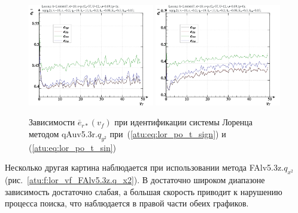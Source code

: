\begin{figure}[h!]
  \centerline{
    \includegraphics[width=0.49\textwidth]{p/cha/lor/qAuv5.3r/lor_qAuv5_3r_qy2-p_v_f_e_sign.png}
    \hfill
    \includegraphics[width=0.49\textwidth]{p/cha/lor/qAuv5.3r/lor_qAuv5_3r_qy2-p_v_f_e_sin.png}
  }
  \caption{Зависимости $\overline{e}_{r*}(v_f)$ при идентификации системы Лоренца методом qAuv5.3r.$q_{y^2}$
   при~(\ref{atu:eq:lor_po_t_sign}) и (\ref{atu:eq:lor_po_t_sin})}
  \label{atu:f:lor_vf_qAuv5.3r.q_y2}
\end{figure}

Несколько другая картина наблюдается при использовании метода  FAlv5.3z.$q_{x^2}$
(рис.~\ref{atu:f:lor_vf_FAlv5.3z.q_x2}).
В достаточно широком диапазоне зависимость достаточно слабая,
а большая скорость приводит к нарушению процесса поиска,
что наблюдается в правой части обеих графиков.

